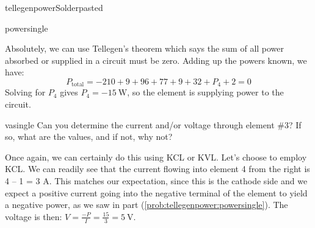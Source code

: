 \begin{mainquestion}{tellegenpower}{Solderpasted}
\begin{partquestion}{powersingle}
\begin{answer}
Absolutely, we can use Tellegen’s theorem which says the sum of all power absorbed or supplied in a circuit must be zero.  Adding up the powers known, we have:
\[
P_{\text{total}}=-210+9+96+77+9+32+P_4+2=0
\]
Solving for $P_4$ gives $P_4=\qty{-15}{\watt}$, so the element is supplying power to the circuit. 

\end{answer}
\end{partquestion}

\begin{partquestion}{vasingle}
{Can you determine the current and/or voltage through element \#3?  If so, what are the values, and if not, why not?}

\begin{answer}
Once again, we can certainly do this using KCL or KVL.  Let’s choose to employ KCL.  We can readily see that the current flowing into element 4 from the right is 4 – 1 = 3 A.  This matches our expectation, since this is the cathode side and we expect a positive current going into the negative terminal of the element to yield a negative power, as we saw in part (\cref{prob:tellegenpower:powersingle}).  The voltage is then: $V=\frac{-P}{I}=\frac{15}{3}=\qty{5}{\volt}.$
\end{answer}
\end{partquestion}

\end{mainquestion}